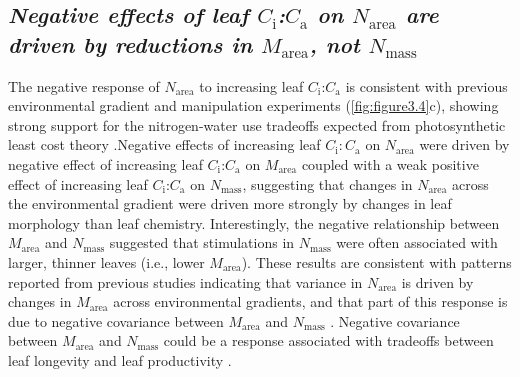 \begin{singlespace}
\subsection{\textit{Negative effects of leaf $C_\mathrm{i}$:$C_\mathrm{a}$ on $N_\mathrm{area}$ are driven by reductions in $M_\mathrm{area}$, not $N_\mathrm{mass}$}}
\end{singlespace}
\noindent The negative response of $N_\mathrm{area}$ to increasing leaf $C_\mathrm{i}$:$C_\mathrm{a}$ is consistent with previous environmental gradient  and manipulation experiments (\ref{fig:figure3.4}c), showing strong support for the nitrogen-water use tradeoffs expected from photosynthetic least cost theory .Negative effects of increasing leaf $C_\mathrm{i}\mathrm{:}C_\mathrm{a}$ on $N_\mathrm{area}$ were driven by  negative effect of increasing leaf $C_\mathrm{i}$:$C_\mathrm{a}$ on $M_\mathrm{area}$ coupled with a weak positive effect of increasing leaf $C_\mathrm{i}$:$C_\mathrm{a}$ on $N_\mathrm{mass}$, suggesting that changes in $N_\mathrm{area}$ across the environmental gradient were driven more strongly by changes in leaf morphology than leaf chemistry. Interestingly, the negative relationship between $M_\mathrm{area}$ and $N_\mathrm{mass}$ suggested that stimulations in $N_\mathrm{mass}$ were often associated with larger, thinner leaves (i.e., lower $M_\mathrm{area}$). These results are consistent with patterns reported from previous studies indicating that variance in $N_\mathrm{area}$ is driven by changes in $M_\mathrm{area}$ across environmental gradients, and that part of this response is due to negative covariance between $M_\mathrm{area}$ and $N_\mathrm{mass}$ . Negative covariance between $M_\mathrm{area}$ and $N_\mathrm{mass}$ could be a response associated with tradeoffs between leaf longevity and leaf productivity .

